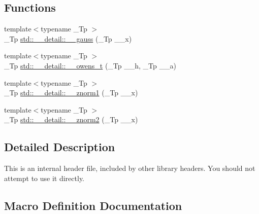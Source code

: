 \subsection*{Functions}
\begin{DoxyCompactItemize}
\item 
{\footnotesize template$<$typename \+\_\+\+Tp $>$ }\\\+\_\+\+Tp \hyperlink{namespacestd_1_1____detail_afdb25beb2328b74d64d9be03de64c442}{std\+::\+\_\+\+\_\+detail\+::\+\_\+\+\_\+gauss} (\+\_\+\+Tp \+\_\+\+\_\+x)
\item 
{\footnotesize template$<$typename \+\_\+\+Tp $>$ }\\\+\_\+\+Tp \hyperlink{namespacestd_1_1____detail_a5b50a9d8beaca5a637c8293ab01bf124}{std\+::\+\_\+\+\_\+detail\+::\+\_\+\+\_\+owens\+\_\+t} (\+\_\+\+Tp \+\_\+\+\_\+h, \+\_\+\+Tp \+\_\+\+\_\+a)
\item 
{\footnotesize template$<$typename \+\_\+\+Tp $>$ }\\\+\_\+\+Tp \hyperlink{namespacestd_1_1____detail_a6827b123253cc6a19947406339738bd7}{std\+::\+\_\+\+\_\+detail\+::\+\_\+\+\_\+znorm1} (\+\_\+\+Tp \+\_\+\+\_\+x)
\item 
{\footnotesize template$<$typename \+\_\+\+Tp $>$ }\\\+\_\+\+Tp \hyperlink{namespacestd_1_1____detail_adf930b70ca943c6810ac7d2ea78d2cc3}{std\+::\+\_\+\+\_\+detail\+::\+\_\+\+\_\+znorm2} (\+\_\+\+Tp \+\_\+\+\_\+x)
\end{DoxyCompactItemize}


\subsection{Detailed Description}
This is an internal header file, included by other library headers. You should not attempt to use it directly. 

\subsection{Macro Definition Documentation}
\mbox{\label{sf__owens__t_8tcc_a5986cbb2c459a5e859ffe2fe1fa7cd25}} 

